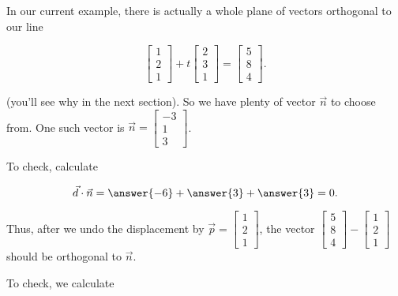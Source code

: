 \documentclass{ximera}
\begin{document}
\begin{solution}
  In our current example, there is actually a whole plane of vectors orthogonal to our line 

  \begin{equation*}
    \begin{bmatrix} 1 \\ 2 \\ 1 \end{bmatrix}
    + t \begin{bmatrix} 2 \\ 3 \\ 1 \end{bmatrix}
    = \begin{bmatrix} 5 \\ 8 \\ 4 \end{bmatrix}.
  \end{equation*}

  (you'll see why in the next section). So we have plenty of vector $\vec{n}$ to choose from. One such vector is $\vec{n}=\begin{bmatrix}
    -3\\1\\3
  \end{bmatrix}$. 
  
  To check, calculate 

  $$\vec{d}\cdot \vec{n}=\answer{-6}+\answer{3}+\answer{3}=0.$$

  Thus, after we undo the displacement by $\vec{p}=\begin{bmatrix}
    1\\2\\1
  \end{bmatrix}$, the vector $\begin{bmatrix}
    5\\8\\4
  \end{bmatrix}-\begin{bmatrix}
    1\\2\\1
  \end{bmatrix}$ should be orthogonal to $\vec{n}$.

  To check, we calculate


\end{solution}
\end{document}
